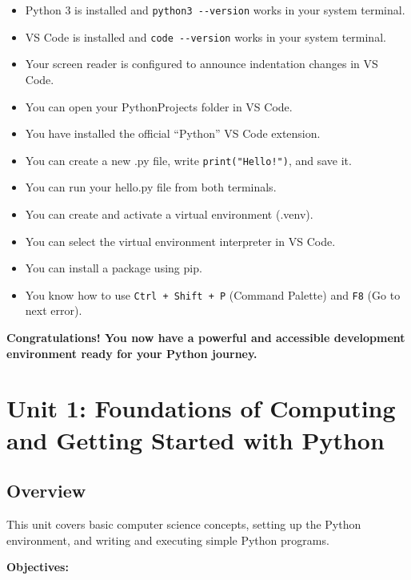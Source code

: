\documentclass[
  justified,
  openright,
]{tufte-book}
\providecommand{\tightlist}{%
  \setlength{\itemsep}{0pt}\setlength{\parskip}{0pt}}
\begin{document}
\begin{itemize}
\tightlist
\item[$\square$]
  Python 3 is installed and \texttt{python3\ -\/-version} works in your
  system terminal.
\item[$\square$]
  VS Code is installed and \texttt{code\ -\/-version} works in your
  system terminal.
\item[$\square$]
  Your screen reader is configured to announce indentation changes in VS
  Code.
\item[$\square$]
  You can open your PythonProjects folder in VS Code.
\item[$\square$]
  You have installed the official ``Python'' VS Code extension.
\item[$\square$]
  You can create a new .py file, write \texttt{print("Hello!")}, and
  save it.
\item[$\square$]
  You can run your hello.py file from both terminals.
\item[$\square$]
  You can create and activate a virtual environment (.venv).
\item[$\square$]
  You can select the virtual environment interpreter in VS Code.
\item[$\square$]
  You can install a package using pip.
\item[$\square$]
  You know how to use \texttt{Ctrl\ +\ Shift\ +\ P} (Command Palette)
  and \texttt{F8} (Go to next error).
\end{itemize}

\textbf{Congratulations! You now have a powerful and accessible
development environment ready for your Python journey.}

\newpage

\section{Unit 1: Foundations of Computing and Getting Started with
Python}\label{unit-1-foundations-of-computing-and-getting-started-with-python}

\subsection{Overview}\label{overview-1}

This unit covers basic computer science concepts, setting up the Python
environment, and writing and executing simple Python programs.

\textbf{Objectives:}
\end{document}
